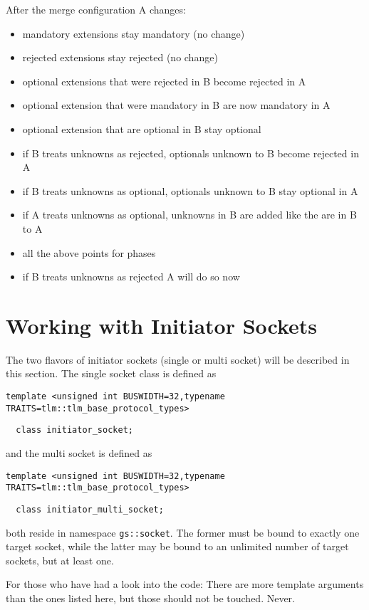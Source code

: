 \documentclass[a4paper,10pt]{article}          %
\begin{document}
\begin{enumerate}
After the merge configuration A changes:
\begin{itemize}
\item mandatory extensions stay mandatory (no change)
\item rejected extensions stay rejected (no change)
\item optional extensions that were rejected in B become rejected in A
\item optional extension that were mandatory in B are now mandatory in A
\item optional extension that are optional in B stay optional
\item if B treats unknowns as rejected, optionals unknown to B become rejected in A
\item if B treats unknowns as optional, optionals unknown to B stay optional in A
\item if A treats unknowns as optional, unknowns in B are added like the are in B to A
\item all the above points for phases
\item if B treats unknowns as rejected A will do so now
\end{itemize}
\end{enumerate}

\newpage
\section{Working with Initiator Sockets}

The two flavors of initiator sockets (single or multi socket) will be described in this section. The single socket class is defined as 

\verb|template <unsigned int BUSWIDTH=32,typename TRAITS=tlm::tlm_base_protocol_types>|

\verb|  class initiator_socket;|

\noindent and the multi socket is defined as

\verb|template <unsigned int BUSWIDTH=32,typename TRAITS=tlm::tlm_base_protocol_types>|

\verb|  class initiator_multi_socket;|

\noindent both reside in namespace \verb|gs::socket|. The former must be bound to exactly one target socket, while the latter may be bound to an unlimited number of target sockets, but at least one.

For those who have had a look into the code: There are more template arguments than the ones listed here, but those should not be touched. Never.
\end{document}

